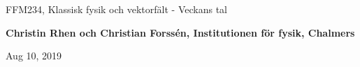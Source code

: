 \documentclass[%
oneside,                 %
final,                   %
10pt]{article}
\begin{document}

\newcommand{\exercisesection}[1]{\subsection*{#1}}







\thispagestyle{empty}

\begin{center}
{\LARGE\bf
\begin{spacing}{1.25}
FFM234, Klassisk fysik och vektorfält - Veckans tal
\end{spacing}
}
\end{center}


\begin{center}
{\bf Christin Rhen och Christian Forssén, Institutionen för  fysik, Chalmers${}^{}$} \\ [0mm]
\end{center}

\begin{center}
\end{center}
    

\begin{center}
Aug 10, 2019
\end{center}

\vspace{1cm}
\end{document}
